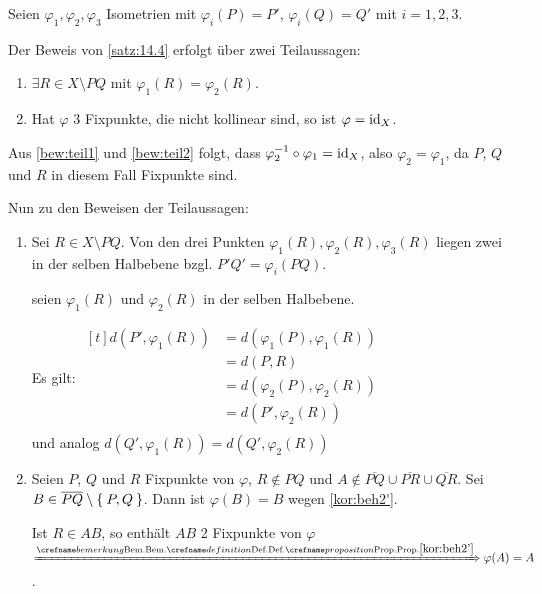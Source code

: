 \begin{beweis}
    Seien $\varphi_1, \varphi_2, \varphi_3$ Isometrien mit
    $\varphi_i(P) = P'$, $\varphi_i(Q) = Q'$ mit $i=1,2,3$.

    Der Beweis von \cref{satz:14.4} erfolgt über zwei Teilaussagen:

    \begin{enumerate}[label=(Teil \roman*),ref=(Teil \roman*)]
        \item \label{bew:teil1} $\exists R \in X \setminus PQ$ mit $\varphi_{1} (R) = \varphi_{2} (R)$.
        \item \label{bew:teil2} Hat $\varphi$ 3 Fixpunkte, die nicht kollinear sind, so ist $\varphi = \textnormal{id}_X$.
    \end{enumerate}

    Aus \ref{bew:teil1} und \ref{bew:teil2} folgt, dass $\varphi_2^{-1} \circ \varphi_1 = \textnormal{id}_X$,
    also $\varphi_2 = \varphi_1$, da $P$, $Q$ und $R$ in diesem Fall
    Fixpunkte sind.

    Nun zu den Beweisen der Teilaussagen:
    \begin{enumerate}[label=(Teil \roman*),ref=(Teil \roman*)]
        \item Sei $R \in X \setminus PQ$. Von den drei Punkten
            $\varphi_1(R), \varphi_2(R), \varphi_3(R)$ liegen zwei
            in der selben Halbebene bzgl. $P'Q' = \varphi_i(PQ)$.

            \Obda seien $\varphi_1(R)$ und $\varphi_2(R)$ in der
            selben Halbebene.

            Es gilt: $\begin{aligned}[t]
                d(P', \varphi_1(R)) &= d(\varphi_1(P), \varphi_1(R))\\
                    &= d(P, R)\\
                    &= d(\varphi_2(P), \varphi_2(R))\\
                    &= d(P', \varphi_2(R))\\
            \end{aligned}$\\
            und analog $d(Q', \varphi_1(R)) = d(Q', \varphi_2(R))$
        \item Seien $P$, $Q$ und $R$ Fixpunkte von $\varphi$, $R \notin PQ$
        und $A \notin \overline{PQ} \cup \overline{PR} \cup \overline{QR}$.
        Sei $B \in \overline{PQ} \setminus \Set{P, Q}$. Dann ist
        $\varphi(B) = B$ wegen \cref{kor:beh2'}.

        Ist $R \in AB$, so enthält $AB$ 2 Fixpunkte von $\varphi$
        $\xRightarrow{\crefabbr{kor:beh2'}} \varphi(A) = A$.


\end{enumerate}
\end{beweis}
